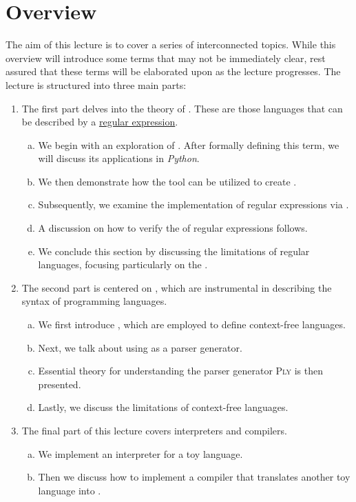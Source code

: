 \section{Overview}
The aim of this lecture is to cover a series of interconnected topics.
While this overview will introduce some terms that may not be immediately clear, rest assured that these terms will
be elaborated upon as the lecture progresses.
The lecture is structured into three main parts: 

\begin{enumerate}
\item The first part delves into the theory of .  These are those languages that can be
  described by a \href{https://en.wikipedia.org/wiki/regular_expression}{regular expression}.
  \begin{enumerate}[(a)]
  \item We begin with an exploration of . After formally defining this term, we will discuss its applications in \textsl{Python}.
  \item We then demonstrate how the  tool can be utilized to create .
  \item Subsequently, we examine the implementation of regular expressions via .
  \item A discussion on how to verify the  of regular expressions follows.
  \item We conclude this section by discussing the limitations of regular languages, focusing particularly on the .
  \end{enumerate}
  
\item The second part is centered on , which are instrumental in describing the syntax of programming languages.
  \begin{enumerate}[(a)]
  \item We first introduce , which are employed to define context-free languages.
  \item Next, we talk about using  as a parser generator.
  \item Essential theory for understanding the parser generator \textsc{Ply} is then presented.
  \item Lastly, we discuss the limitations of context-free languages.
  \end{enumerate}

\item The final part of this lecture covers interpreters and compilers.
  \begin{enumerate}[(a)]
  \item We implement an interpreter for a toy language.
  \item Then we discuss how to implement a compiler that translates another toy language into .
  \end{enumerate}
\end{enumerate}

